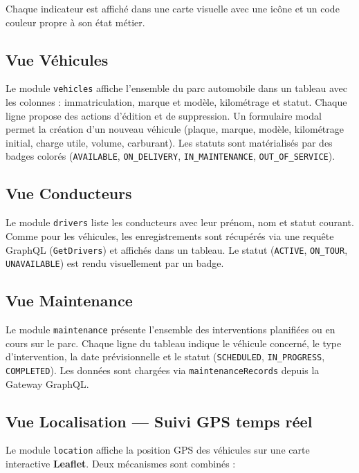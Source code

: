 \documentclass[12pt,a4paper]{article}
\begin{document}
Chaque indicateur est affich\'{e} dans une carte visuelle avec une ic\^{o}ne et un code couleur propre \`{a} son \'{e}tat m\'{e}tier.

\subsection{Vue V\'{e}hicules}

Le module \texttt{vehicles} affiche l'ensemble du parc automobile dans un tableau avec les colonnes : immatriculation, marque et mod\`{e}le, kilom\'{e}trage et statut. Chaque ligne propose des actions d'\'{e}dition et de suppression. Un formulaire modal permet la cr\'{e}ation d'un nouveau v\'{e}hicule (plaque, marque, mod\`{e}le, kilom\'{e}trage initial, charge utile, volume, carburant). Les statuts sont mat\'{e}rialis\'{e}s par des badges color\'{e}s (\texttt{AVAILABLE}, \texttt{ON\_DELIVERY}, \texttt{IN\_MAINTENANCE}, \texttt{OUT\_OF\_SERVICE}).

\subsection{Vue Conducteurs}

Le module \texttt{drivers} liste les conducteurs avec leur pr\'{e}nom, nom et statut courant. Comme pour les v\'{e}hicules, les enregistrements sont r\'{e}cup\'{e}r\'{e}s via une requ\^{e}te GraphQL (\texttt{GetDrivers}) et affich\'{e}s dans un tableau. Le statut (\texttt{ACTIVE}, \texttt{ON\_TOUR}, \texttt{UNAVAILABLE}) est rendu visuellement par un badge.

\subsection{Vue Maintenance}

Le module \texttt{maintenance} pr\'{e}sente l'ensemble des interventions planifi\'{e}es ou en cours sur le parc. Chaque ligne du tableau indique le v\'{e}hicule concern\'{e}, le type d'intervention, la date pr\'{e}visionnelle et le statut (\texttt{SCHEDULED}, \texttt{IN\_PROGRESS}, \texttt{COMPLETED}). Les donn\'{e}es sont charg\'{e}es via \texttt{maintenanceRecords} depuis la Gateway GraphQL.

\subsection{Vue Localisation --- Suivi GPS temps r\'{e}el}

Le module \texttt{location} affiche la position GPS des v\'{e}hicules sur une carte interactive \textbf{Leaflet}. Deux m\'{e}canismes sont combin\'{e}s :
\end{document}
